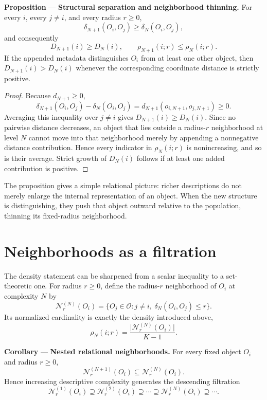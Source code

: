 \documentclass[10pt]{article}
\begin{document}
\begin{resultbox}
\textbf{Proposition} --- \textbf{Structural separation and neighborhood thinning.}
For every $i$, every $j\ne i$, and every radius $r\ge 0$,
\[
\delta_{N+1}(O_i,O_j)\ge \delta_N(O_i,O_j),
\]
and consequently
\[
D_{N+1}(i)\ge D_N(i),
\qquad
\rho_{N+1}(i;r)\le \rho_N(i;r).
\]
If the appended metadata distinguishes $O_i$ from at least one other object, then $D_{N+1}(i)>D_N(i)$ whenever the corresponding coordinate distance is strictly positive.
\end{resultbox}

\begin{proof}
Because $d_{N+1}\ge 0$,
\[
\delta_{N+1}(O_i,O_j)-\delta_N(O_i,O_j)
=d_{N+1}(o_{i,N+1},o_{j,N+1})\ge 0.
\]
Averaging this inequality over $j\ne i$ gives $D_{N+1}(i)\ge D_N(i)$. Since no pairwise distance decreases, an object that lies outside a radius-$r$ neighborhood at level $N$ cannot move into that neighborhood merely by appending a nonnegative distance contribution. Hence every indicator in $\rho_N(i;r)$ is nonincreasing, and so is their average. Strict growth of $D_N(i)$ follows if at least one added contribution is positive.
\end{proof}

The proposition gives a simple relational picture: richer descriptions do not merely enlarge the internal representation of an object. When the new structure is distinguishing, they push that object outward relative to the population, thinning its fixed-radius neighborhood.

\section*{Neighborhoods as a filtration}
The density statement can be sharpened from a scalar inequality to a set-theoretic one. For radius $r\ge 0$, define the radius-$r$ neighborhood of $O_i$ at complexity $N$ by
\[
\mathcal N_r^{(N)}(O_i)
=\{O_j\in\mathcal O:j\ne i,\ \delta_N(O_i,O_j)\le r\}.
\]
Its normalized cardinality is exactly the density introduced above,
\[
\rho_N(i;r)=\frac{\lvert\mathcal N_r^{(N)}(O_i)\rvert}{K-1}.
\]

\begin{resultbox}
\textbf{Corollary} --- \textbf{Nested relational neighborhoods.}
For every fixed object $O_i$ and radius $r\ge 0$,
\[
\mathcal N_r^{(N+1)}(O_i)\subseteq\mathcal N_r^{(N)}(O_i).
\]
Hence increasing descriptive complexity generates the descending filtration
\[
\mathcal N_r^{(1)}(O_i)\supseteq\mathcal N_r^{(2)}(O_i)
\supseteq\cdots\supseteq\mathcal N_r^{(N)}(O_i)\supseteq\cdots.
\]
\end{resultbox}
\end{document}
